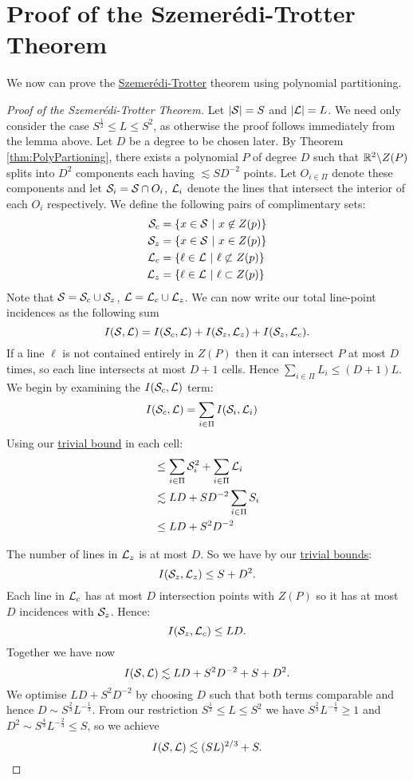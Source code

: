 \section{Proof of the Szemerédi-Trotter Theorem \label{sect:prf-of-ST}}
We now can prove the \hyperref[thm:S-T]{Szemerédi-Trotter} theorem using polynomial partitioning.
\begin{proof}[Proof of the Szemerédi-Trotter Theorem]
Let $|\mathcal S| = S$ and $|\mathcal L| = L$.
We need only consider the case $S^{\frac{1}{2}} \leq L \leq S^2$, as otherwise the proof follows immediately from the lemma above. 
Let $D$ be a degree to be chosen later. By Theorem \ref{thm:PolyPartioning}, there
exists a polynomial $P$ of degree $D$ such that $\mathbb R^2 \backslash Z(P)$ splits into $D^2$ components each having $\lesssim SD^{-2}$ points. 
Let $O_{i \in \Pi}$ denote these components and let $\mathcal S_i = \mathcal S \cap O_i$, $\mathcal L_i$ denote the lines that intersect the interior of each $O_i$ respectively.
We define the following pairs of complimentary sets:
\begin{align*}
    \mathcal S_c &=\{x \in \mathcal S \ |\ x \not \in Z(p)\}\\
    \mathcal S_z &=\{x \in \mathcal S \ |\ x \in Z(p)\}\\
    \mathcal L_c &=\{\ell \in \mathcal L \ |\ \ell \not \subset Z(p)\}\\
    \mathcal L_z &=\{\ell \in \mathcal L \ |\ \ell \subset Z(p)\}
\end{align*} 
Note that $\mathcal S = \mathcal S_c \cup \mathcal S_z$, $\mathcal L = \mathcal L_c \cup \mathcal L_z$. We can now write our total line-point incidences as the following sum
$$I(\mathcal S, \mathcal L) = I(\mathcal S_c, \mathcal L) + I(\mathcal S_z, \mathcal L_z) + I(\mathcal S_z, \mathcal L_c).$$
If a line $\ell$ is not contained entirely in $Z(P)$ then it can intersect $P$ at most $D$ times, 
 so each line intersects at most $D+1$ cells. Hence $\sum_{i \in \Pi} L_i \leq (D+1)L$. We begin by examining the $I(\mathcal S_c, \mathcal L)$ term:
\begin{align*}
I(\mathcal S_c, \mathcal L) &= \sum_{i \in \Pi} I(\mathcal S_i, \mathcal L_i)
\end{align*}
Using our \hyperref[thm:trivial-ST-bounds]{trivial bound} in each cell:
\begin{align*}
&\leq \sum_{i \in \Pi} \mathcal S_i^2 + \sum_{i \in \Pi} \mathcal L_i\\
&\lesssim LD + SD^{-2} \sum_{i \in \Pi} S_i\\ &\leq LD + S^2D^{-2}
\end{align*} 


The number of lines in $\mathcal L_z$ is at most $D$. So we have by our \hyperref[thm:trivial-ST-bounds]{trivial bounds}:
$$I(\mathcal S_z, \mathcal L_z) \leq S + D^2.$$
Each line in $\mathcal L_c$ has at most $D$ intersection points with $Z(P)$ so it has at most $D$ incidences with $\mathcal S_z$. Hence:
 $$I(\mathcal S_z, \mathcal L_c) \leq LD.$$
Together we have now 
$$I(\mathcal S, \mathcal L) \lesssim LD + S^2D^{-2} +S + D^2.$$
We optimise $LD + S^2D^{-2}$ by choosing $D$ such that both terms comparable and hence $D \sim S^{\frac{2}{3}} L^{-\frac{1}{3}}$. 
From our restriction $S^{\frac{1}{2}} \leq L \leq S^2$ we have $S^{\frac{2}{3}} L^{-\frac{1}{3}} \geq 1$
and $D^2 \sim S^{\frac{4}{3}} L^{-\frac{2}{3}} \leq S$, so we achieve
$$I(\mathcal S, \mathcal L) \lesssim (SL)^{2/3} + S. $$


\end{proof}
